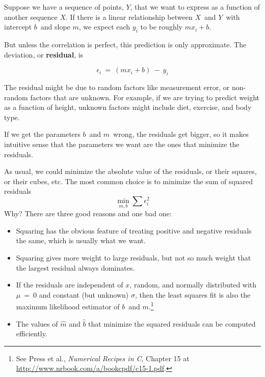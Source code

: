 Suppose we have a sequence of points, $Y$, that we want to express as a
function of another sequence $X$.  If there is a linear relationship
between $X$~and $Y$~with intercept $b$~and slope $m$, we
expect each $y_{i}$ to be roughly $m x_i + b$.

But unless the correlation is perfect, this prediction is only
approximate.  The deviation, or {\bf residual}, is 

\[ \epsilon_{i}~=~(m x_{i}+b)~-~y_{i} \]

The residual might be due to random factors like measurement error,
or non-random factors that are unknown.  For example, if we are
trying to predict weight as a function of height, unknown factors
might include diet, exercise, and body type.

If we get the parameters $b$~and $m$~wrong, the residuals
get bigger, so it makes intuitive sense that the parameters we want
are the ones that minimize the residuals.

As usual, we could minimize the absolute value of the
residuals, or their squares, or their cubes, etc.  The most common
choice is to minimize the sum of squared residuals
%
\[ \min_{m,b} \sum \epsilon_i^2 \]
%
Why?  There are three good reasons and one bad one:

\begin{itemize}

\item Squaring has the obvious feature of treating positive and
negative residuals the same, which is usually what we want.

\item Squaring gives more weight to large residuals, but not
so much weight that the largest residual always dominates.

\item If the residuals are independent of $x$, random, and normally
  distributed with $\mu~=~0$ and constant (but unknown) $\sigma$, then
  the least squares fit is also the maximum likelihood estimator of
  $b$~and $m$.\footnote{See Press et al., {\em Numerical Recipes in C},
    Chapter 15 at \url{http://www.nrbook.com/a/bookcpdf/c15-1.pdf}.}

\item The values of $\hat{m}$ and $\hat{b}$ that minimize
  the squared residuals can be computed efficiently.

\end{itemize}


